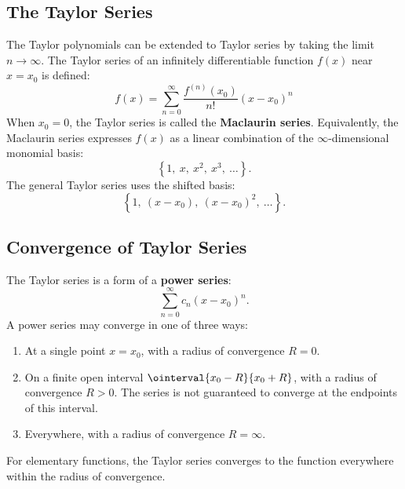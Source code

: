 \documentclass{article}
\begin{document}
\subsection{The Taylor Series}
The Taylor polynomials can be extended to Taylor series by taking the
limit \(n \to \infty\). The Taylor series of an infinitely
differentiable function \(f\left( x \right)\) near \(x = x_0\) is
defined:
\begin{equation*}
    f\left( x \right) = \sum_{n=0}^{\infty} \frac{f^{\left( n \right)}\left( x_0 \right)}{n!} {\left( x - x_0 \right)}^n
\end{equation*}
When \(x_0 = 0\), the Taylor series is called the \textbf{Maclaurin series}.
Equivalently, the Maclaurin series expresses \(f\left( x \right)\) as a
linear combination of the \(\infty\)-dimensional monomial basis:
\begin{equation*}
    \left\{ 1,\: x,\: x^2,\: x^3,\: \ldots \right\}.
\end{equation*}
The general Taylor series uses the shifted basis:
\begin{equation*}
    \left\{ 1,\: \left( x - x_0 \right),\: {\left( x - x_0 \right)}^2,\: \ldots \right\}.
\end{equation*}
\subsection{Convergence of Taylor Series}
The Taylor series is a form of a \textbf{power series}:
\begin{equation*}
    \sum_{n=0}^{\infty} c_n {\left( x - x_0 \right)}^n.
\end{equation*}
A power series may converge in one of three ways:
\begin{enumerate}[label=(\arabic*)]
    \item At a single point \(x = x_0\), with a radius of convergence
          \(R = 0\).
    \item On a finite open interval \(\ointerval{x_0 - R}{x_0 + R}\),
          with a radius of convergence \(R > 0\). The series is not
          guaranteed to converge at the endpoints of this interval.
    \item Everywhere, with a radius of convergence \(R = \infty\).
\end{enumerate}
For elementary functions, the Taylor series converges to the function
everywhere within the radius of convergence.
\end{document}

